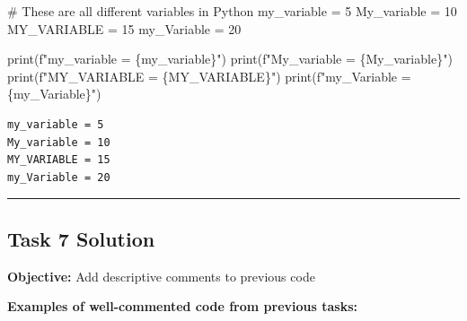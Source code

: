 \documentclass[
  11pt,
]{article}
\newenvironment{Shaded}{\begin{snugshade}}{\end{snugshade}}
\newcommand{\BuiltInTok}[1]{\textcolor[rgb]{0.00,0.23,0.31}{#1}}
\newcommand{\CommentTok}[1]{\textcolor[rgb]{0.37,0.37,0.37}{#1}}
\newcommand{\DecValTok}[1]{\textcolor[rgb]{0.68,0.00,0.00}{#1}}
\newcommand{\NormalTok}[1]{\textcolor[rgb]{0.00,0.23,0.31}{#1}}
\newcommand{\OperatorTok}[1]{\textcolor[rgb]{0.37,0.37,0.37}{#1}}
\newcommand{\SpecialCharTok}[1]{\textcolor[rgb]{0.37,0.37,0.37}{#1}}
\newcommand{\SpecialStringTok}[1]{\textcolor[rgb]{0.13,0.47,0.30}{#1}}
\begin{document}
\begin{Shaded}
\begin{Highlighting}[]
\CommentTok{\# These are all different variables in Python}
\NormalTok{my\_variable }\OperatorTok{=} \DecValTok{5}
\NormalTok{My\_variable }\OperatorTok{=} \DecValTok{10}
\NormalTok{MY\_VARIABLE }\OperatorTok{=} \DecValTok{15}
\NormalTok{my\_Variable }\OperatorTok{=} \DecValTok{20}

\BuiltInTok{print}\NormalTok{(}\SpecialStringTok{f"my\_variable = }\SpecialCharTok{\{}\NormalTok{my\_variable}\SpecialCharTok{\}}\SpecialStringTok{"}\NormalTok{)}
\BuiltInTok{print}\NormalTok{(}\SpecialStringTok{f"My\_variable = }\SpecialCharTok{\{}\NormalTok{My\_variable}\SpecialCharTok{\}}\SpecialStringTok{"}\NormalTok{)}
\BuiltInTok{print}\NormalTok{(}\SpecialStringTok{f"MY\_VARIABLE = }\SpecialCharTok{\{}\NormalTok{MY\_VARIABLE}\SpecialCharTok{\}}\SpecialStringTok{"}\NormalTok{)}
\BuiltInTok{print}\NormalTok{(}\SpecialStringTok{f"my\_Variable = }\SpecialCharTok{\{}\NormalTok{my\_Variable}\SpecialCharTok{\}}\SpecialStringTok{"}\NormalTok{)}
\end{Highlighting}
\end{Shaded}

\begin{verbatim}
my_variable = 5
My_variable = 10
MY_VARIABLE = 15
my_Variable = 20
\end{verbatim}

\begin{center}\rule{0.5\linewidth}{0.5pt}\end{center}

\subsection{Task 7 Solution}\label{task-7-solution}

\textbf{Objective:} Add descriptive comments to previous code

\textbf{Examples of well-commented code from previous tasks:}
\end{document}
